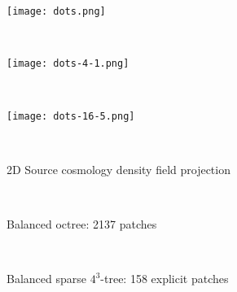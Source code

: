 \documentclass[14pt]{article}
\begin{document}
\begin{center}
\begin{minipage}{7.0in}
\begin{minipage}{2.2in}
\texttt{[image: dots.png]}
\end{minipage} \ 
\begin{minipage}{2.2in}
\texttt{[image: dots-4-1.png]}
\end{minipage} \ 
\begin{minipage}{2.2in}
\texttt{[image: dots-16-5.png]}
\end{minipage}
\end{minipage} \\
\begin{minipage}{7in}
\begin{minipage}[t]{2.2in}
2D Source cosmology density field projection
\end{minipage} \ 
\begin{minipage}[t]{2.2in}
Balanced octree: 2137 patches
\end{minipage} \ 
\begin{minipage}[t]{2.2in}
Balanced sparse $4^3$-tree: 158 explicit patches
\end{minipage}
\end{minipage}
\end{center}
\end{document}
